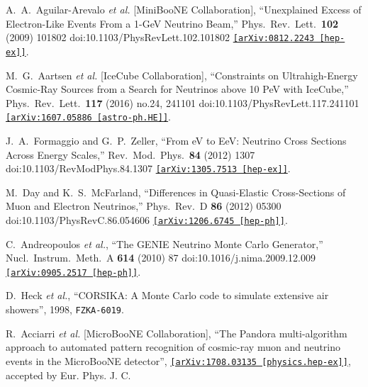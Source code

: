 \begin{thebibliography}{99}

  A.~A.~Aguilar-Arevalo {\emph{et al.}} [MiniBooNE Collaboration],
  ``Unexplained Excess of Electron-Like Events From a 1-GeV Neutrino Beam,''
  Phys.\ Rev.\ Lett.\  \textbf{102} (2009) 101802
  doi:10.1103/PhysRevLett.102.101802
  \href{https://arxiv.org/abs/0812.2243}{\texttt{[arXiv:0812.2243 [hep-ex]]}}.
  
  M.~G.~Aartsen {\emph{et al.}} [IceCube Collaboration],
  ``Constraints on Ultrahigh-Energy Cosmic-Ray Sources from a Search for Neutrinos above 10 PeV with IceCube,''
  Phys.\ Rev.\ Lett.\  \textbf{117} (2016) no.24,  241101
  doi:10.1103/PhysRevLett.117.241101
  \href{https://arxiv.org/abs/1607.05886}{\texttt{[arXiv:1607.05886 [astro-ph.HE]]}}.
  
  J.~A.~Formaggio and G.~P.~Zeller,
  ``From eV to EeV: Neutrino Cross Sections Across Energy Scales,''
  Rev.\ Mod.\ Phys.\  \textbf{84} (2012) 1307
  doi:10.1103/RevModPhys.84.1307
  \href{https://arxiv.org/abs/1305.7513}{\texttt{[arXiv:1305.7513 [hep-ex]]}}.
  
  
  M.~Day and K.~S.~McFarland,
  ``Differences in Quasi-Elastic Cross-Sections of Muon and Electron Neutrinos,''
  Phys.\ Rev.\ D \textbf{86} (2012) 05300 
  doi:10.1103/PhysRevC.86.054606
  \href{https://arxiv.org/abs/1206.6745}{\texttt{[arXiv:1206.6745 [hep-ph]]}}.
  
  C.~Andreopoulos \emph{et al.},
  ``The GENIE Neutrino Monte Carlo Generator,''
  Nucl.\ Instrum.\ Meth.\ A \textbf{ 614} (2010) 87
  doi:10.1016/j.nima.2009.12.009
  \href{https://arxiv.org/abs/0905.2517}{\texttt{[arXiv:0905.2517 [hep-ph]]}}.
  
   D.~Heck \emph{et al.},
  ``CORSIKA: A Monte Carlo code to simulate extensive air showers'', 1998,
  \texttt{FZKA-6019}.
  
     R.~Acciarri \emph{et al.} [MicroBooNE Collaboration], ``The Pandora multi-algorithm approach to automated pattern recognition of cosmic-ray muon and neutrino events in the MicroBooNE detector'', \href{https://arxiv.org/abs/1708.03135}{\texttt{[arXiv:1708.03135 [physics.hep-ex]]}}, accepted by Eur. Phys. J. C.
  

\end{thebibliography}

